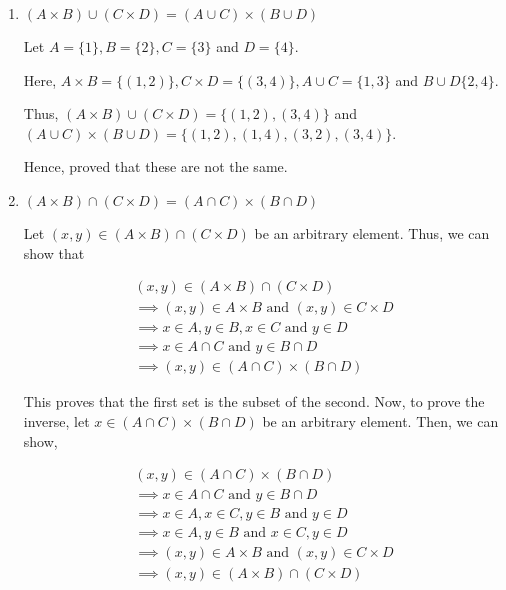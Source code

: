 \begin{problem}
\begin{enumerate}
		\item $(A \times B) \cup (C \times D) = (A \cup C) \times (B \cup D)$
			\begin{solution}
				Let $A = \{1\}, B = \{2\}, C = \{3\}$ and $D = \{4\}$.

				Here, $A \times B = \{(1, 2)\}, C \times D = \{(3,4)\}, 
				A \cup C = \{1, 3\}$ and $B \cup D \{2, 4\}$.

				Thus, $(A \times B) \cup (C \times D) = \{(1, 2), (3, 4)\}$ and 
				$(A \cup C) \times (B \cup D) = \{(1, 2),(1, 4), (3, 2), (3, 4)\}$.

				Hence, proved that these are not the same.
			\end{solution}

		\item $(A \times B) \cap (C \times D) = (A \cap C) \times (B \cap D)$
			\begin{solution}
				Let $(x, y) \in (A \times B) \cap (C \times D)$ be an arbitrary element. Thus, we can show that

				\begin{align}
					(x, y) \in (A \times B) \cap (C \times D) \\
					\implies (x, y) \in A \times B \text{ and } (x, y) \in C \times D \\
					\implies x \in A, y \in B, x \in C \text{ and } y \in D \\
					\implies x \in A \cap C \text{ and } y \in B \cap D \\
					\implies (x, y) \in (A \cap C) \times (B \cap D)
				\end{align}

				This proves that the first set is the subset of the second.
				Now, to prove the inverse, let $x \in (A \cap C) \times (B \cap D)$ be an arbitrary element. Then, we can show,

				\begin{align}
					(x, y) \in (A \cap C) \times (B \cap D) \\
					\implies x \in A \cap C \text{ and } y \in B \cap D \\
					\implies x \in A, x \in C, y \in B \text{ and } y \in D \\
					\implies x \in A, y \in B \text{ and } x \in C, y \in D \\
					\implies (x, y) \in A \times B \text{ and } (x, y) \in C \times D \\
					\implies (x, y) \in (A \times B) \cap (C \times D)
				\end{align}


\end{solution}
\end{enumerate}
\end{problem}
